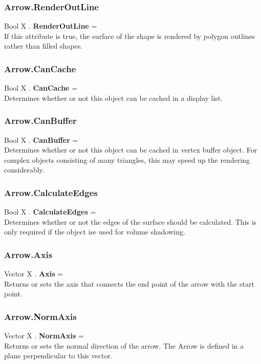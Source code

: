 \documentclass[10pt]{book}
\begin{document}
\subsubsection{Arrow.RenderOutLine \label{F:Arrow:RenderOutLine}}
Bool X . \textbf{RenderOutLine} = \\
If this attribute is true, the surface of the shape is rendered by polygon outlines rather than filled shapes.

\subsubsection{Arrow.CanCache \label{F:Arrow:CanCache}}
Bool X . \textbf{CanCache} = \\
Determines whether or not this object can be cached in a display list.

\subsubsection{Arrow.CanBuffer \label{F:Arrow:CanBuffer}}
Bool X . \textbf{CanBuffer} = \\
Determines whether or not this object can be cached in vertex buffer object. For complex objects consisting of many triangles, this may speed up the rendering considerably.

\subsubsection{Arrow.CalculateEdges \label{F:Arrow:CalculateEdges}}
Bool X . \textbf{CalculateEdges} = \\
Determines whether or not the edges of the surface should be calculated. This is only required if the object ise used for volume shadowing.

\subsubsection{Arrow.Axis \label{F:Arrow:Axis}}
Vector X . \textbf{Axis} = \\
Returns or sets the axis that connects the end point of the arrow with the start point.

\subsubsection{Arrow.NormAxis \label{F:Arrow:NormAxis}}
Vector X . \textbf{NormAxis} = \\
Returns or sets the normal direction of the arrow. The Arrow is defined in a plane perpendicular to this vector.
\end{document}
